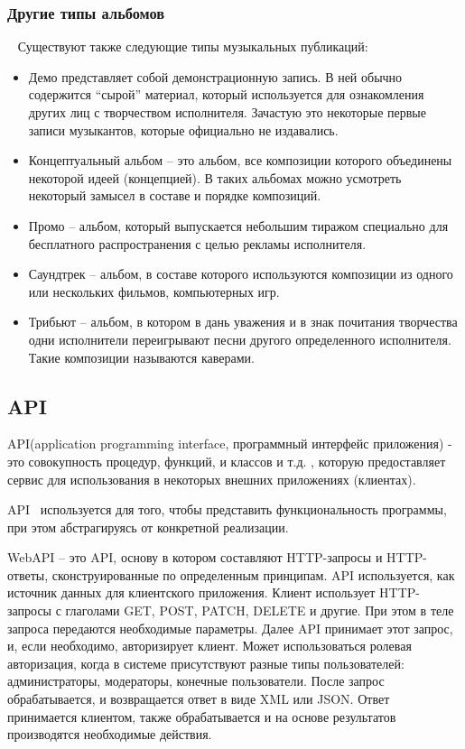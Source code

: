 \subsubsection{Другие типы альбомов}
\label{sub:domain:music_album:other_types_classification}
~\newline
\indent Существуют также следующие типы музыкальных публикаций:
\begin{itemize}
  \item Демо представляет собой демонстрационную запись. В ней обычно содержится “сырой” материал, который используется для ознакомления других лиц с творчеством исполнителя. Зачастую это некоторые первые записи музыкантов, которые официально не издавались.
  \item Концептуальный альбом -- это альбом, все композиции которого объединены некоторой идеей (концепцией). В таких альбомах можно усмотреть некоторый замысел в составе и порядке композиций.
  \item Промо -- альбом, который выпускается небольшим тиражом специально для бесплатного распространения с целью рекламы исполнителя.
  \item Саундтрек -- альбом, в составе которого используются композиции из одного или нескольких фильмов, компьютерных игр.
  \item Трибьют -- альбом, в котором в дань уважения и в знак почитания творчества одни исполнители переигрывают песни другого определенного исполнителя. Такие композиции называются каверами.
\end{itemize}

\subsection{API}
\label{sub:domain:api}
API(application programming interface, программный интерфейс приложения) - это совокупность процедур, функций, и классов и т.д. , которую предоставляет сервис для использования в некоторых внешних приложениях (клиентах).

API~\cite{api_doc} используется для того, чтобы представить функциональность программы, при этом абстрагируясь от конкретной реализации.

WebAPI -- это API, основу в котором составляют HTTP-запросы и HTTP-ответы, сконструированные по определенным принципам. API используется, как источник данных для клиентского приложения. Клиент использует HTTP-запросы с глаголами GET, POST, PATCH, DELETE и другие. При этом в теле запроса передаются необходимые параметры. Далее API принимает этот запрос, и, если необходимо, авторизирует клиент. Может использоваться ролевая авторизация, когда в системе присутствуют разные типы пользователей: администраторы, модераторы, конечные пользователи. После запрос обрабатывается, и возвращается ответ в виде XML или JSON. Ответ принимается клиентом, также обрабатывается и на основе результатов производятся необходимые действия.

